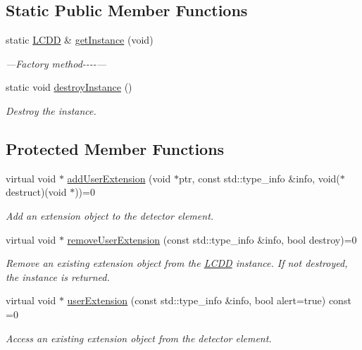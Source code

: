 \subsection*{Static Public Member Functions}
\begin{DoxyCompactItemize}
\item 
static \hyperlink{class_d_d4hep_1_1_geometry_1_1_l_c_d_d}{L\+C\+DD} \& \hyperlink{class_d_d4hep_1_1_geometry_1_1_l_c_d_d_a4ba28eb0e53e15856d7a773c4ff758b9}{get\+Instance} (void)
\begin{DoxyCompactList}\small\item\em ---Factory method-\/-\/-\/-\/--- \end{DoxyCompactList}\item 
static void \hyperlink{class_d_d4hep_1_1_geometry_1_1_l_c_d_d_a7470fc11102bacc2b486590de49a8017}{destroy\+Instance} ()
\begin{DoxyCompactList}\small\item\em Destroy the instance. \end{DoxyCompactList}\end{DoxyCompactItemize}
\subsection*{Protected Member Functions}
\begin{DoxyCompactItemize}
\item 
virtual void $\ast$ \hyperlink{class_d_d4hep_1_1_geometry_1_1_l_c_d_d_ae4fdea118902519ae7581fe0bd733559}{add\+User\+Extension} (void $\ast$ptr, const std\+::type\+\_\+info \&info, void($\ast$destruct)(void $\ast$))=0
\begin{DoxyCompactList}\small\item\em Add an extension object to the detector element. \end{DoxyCompactList}\item 
virtual void $\ast$ \hyperlink{class_d_d4hep_1_1_geometry_1_1_l_c_d_d_a05c121b360d248ce34a2d9337df9f49b}{remove\+User\+Extension} (const std\+::type\+\_\+info \&info, bool destroy)=0
\begin{DoxyCompactList}\small\item\em Remove an existing extension object from the \hyperlink{class_d_d4hep_1_1_geometry_1_1_l_c_d_d}{L\+C\+DD} instance. If not destroyed, the instance is returned. \end{DoxyCompactList}\item 
virtual void $\ast$ \hyperlink{class_d_d4hep_1_1_geometry_1_1_l_c_d_d_a699d446afe8b33487cdce57d4e2f26c6}{user\+Extension} (const std\+::type\+\_\+info \&info, bool alert=true) const =0
\begin{DoxyCompactList}\small\item\em Access an existing extension object from the detector element. \end{DoxyCompactList}\end{DoxyCompactItemize}
